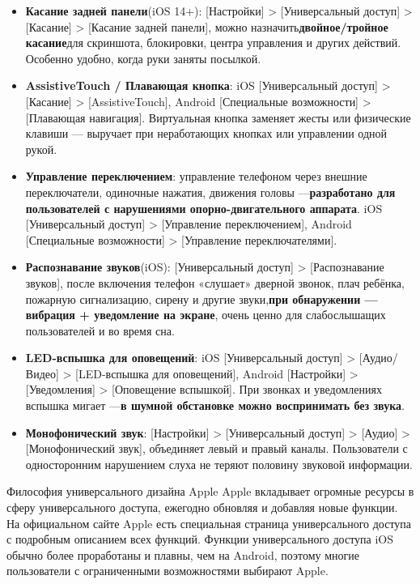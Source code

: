 \begin{itemize}
  \item \textbf{Касание задней панели}(iOS 14+): [Настройки] > [Универсальный доступ] > [Касание] > [Касание задней панели], можно назначить\textbf{двойное/тройное касание}для скриншота, блокировки, центра управления и других действий. Особенно удобно, когда руки заняты посылкой.
  \item \textbf{AssistiveTouch / Плавающая кнопка}: iOS [Универсальный доступ] > [Касание] > [AssistiveTouch], Android [Специальные возможности] > [Плавающая навигация]. Виртуальная кнопка заменяет жесты или физические клавиши — выручает при неработающих кнопках или управлении одной рукой.
  \item \textbf{Управление переключением}: управление телефоном через внешние переключатели, одиночные нажатия, движения головы —\textbf{разработано для пользователей с нарушениями опорно-двигательного аппарата}. iOS [Универсальный доступ] > [Управление переключением], Android [Специальные возможности] > [Управление переключателями].
  \item \textbf{Распознавание звуков}(iOS): [Универсальный доступ] > [Распознавание звуков], после включения телефон «слушает» дверной звонок, плач ребёнка, пожарную сигнализацию, сирену и другие звуки,\textbf{при обнаружении — вибрация + уведомление на экране}, очень ценно для слабослышащих пользователей и во время сна.
  \item \textbf{LED-вспышка для оповещений}: iOS [Универсальный доступ] > [Аудио/Видео] > [LED-вспышка для оповещений], Android [Настройки] > [Уведомления] > [Оповещение вспышкой]. При звонках и уведомлениях вспышка мигает —\textbf{в шумной обстановке можно воспринимать без звука}.
  \item \textbf{Монофонический звук}: [Настройки] > [Универсальный доступ] > [Аудио] > [Монофонический звук], объединяет левый и правый каналы. Пользователи с односторонним нарушением слуха не теряют половину звуковой информации.
\end{itemize}

\begin{tcbinfo}{Философия универсального дизайна Apple}
Apple вкладывает огромные ресурсы в сферу универсального доступа, ежегодно обновляя и добавляя новые функции. На официальном сайте Apple есть специальная страница универсального доступа с подробным описанием всех функций. Функции универсального доступа iOS обычно более проработаны и плавны, чем на Android, поэтому многие пользователи с ограниченными возможностями выбирают Apple.

\end{tcbinfo}

